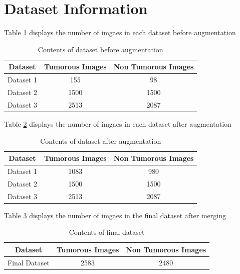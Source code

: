 \section{Dataset Information}
Table \ref{tab:bef_aug} displays the number of imgaes in each dataset before augmentation\\
\begin{table}[h!]
\caption{Contents of dataset before augmentation}
\label{tab:bef_aug}
\begin{tabular}{|c|c|c|}
\hline
\rowcolor[HTML]{CBCEFB} 
\textbf{Dataset} & \textbf{Tumorous Images} & \textbf{Non Tumorous Images} \\ \hline
Dataset 1        & 155                      & 98                           \\ \hline
Dataset 2        & 1500                     & 1500                         \\ \hline
Dataset 3        & 2513                     & 2087                         \\ \hline
\end{tabular}
\end{table}

\noindent Table \ref{tab:af_aug} displays the number of imgaes in each dataset after augmentation\\
\begin{table}[h!]
\caption{Contents of dataset after augmentation}
\label{tab:af_aug}
\begin{tabular}{|c|c|c|}
\hline
\rowcolor[HTML]{CBCEFB} 
\textbf{Dataset} & \textbf{Tumorous Images} & \textbf{Non Tumorous Images} \\ \hline
Dataset 1        & 1083                      & 980                           \\ \hline
Dataset 2        & 1500                     & 1500                         \\ \hline
Dataset 3        & 2513                     & 2087                         \\ \hline
\end{tabular}
\end{table}

\noindent Table \ref{tab:final_data} displays the number of imgaes in the final dataset after merging\\
\begin{table}[h!]
\caption{Contents of final dataset}
\label{tab:final_data}
\begin{tabular}{|c|c|c|}
\hline
\rowcolor[HTML]{CBCEFB} 
\textbf{Dataset} & \textbf{Tumorous Images} & \textbf{Non Tumorous Images} \\ \hline
Final Dataset    & 2583                     & 2480                         \\ \hline
\end{tabular}
\end{table}

